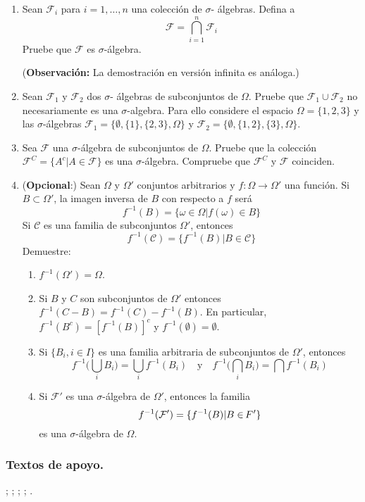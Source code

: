 \begin{enumerate}
	\item Sean $\mathcal{F}_i$ para $i=1,\dots,n$ una colección de $\sigma$- álgebras. Defina a 
	\[
	\mathcal{F} = \bigcap_{i=1}^{n} \mathcal{F}_i
	\]
	Pruebe que $\mathcal{F}$ es $\sigma$-álgebra.
	
	(\textbf{Observación:} La demostración en versión infinita es análoga.)
	
	\item Sean $\mathcal{F}_1$ y $\mathcal{F}_2$ dos $\sigma$- álgebras de subconjuntos de $\Omega$. Pruebe que $\mathcal{F}_1 \cup \mathcal{F}_2$ no necesariamente es una $\sigma$-algebra. Para ello considere el espacio $\Omega = \{1,2,3\}$ y las $\sigma$-álgebras $\mathcal{F}_1 = \{ \emptyset, \{1\}, \{2,3\}, \Omega\}$ y $\mathcal{F}_2 = \{ \emptyset, \{1,2\}, \{3\}, \Omega\}$.
	
	
	\item Sea $\mathcal{F}$ una $\sigma$-álgebra de subconjuntos de $\Omega$. Pruebe que la colección $\mathcal{F}^C = \{ A^c | A \in \mathcal{F}\}$ es una $\sigma$-álgebra. Compruebe que $\mathcal{F}^C$ y $\mathcal{F}$ coinciden.
	
	
	
	\item (\textbf{Opcional}:) Sean $\Omega$ y $\Omega'$ conjuntos arbitrarios y $f:\Omega \rightarrow \Omega'$ una función. Si $B \subset \Omega'$, la imagen inversa de $B$ con respecto a $f$ será 
\[
f^{-1}(B) = \{ \omega \in \Omega | f(\omega ) \in B\}
\]
Si $\mathcal{C}$ es una familia de subconjuntos $\Omega'$, entonces
\[
f^{-1} (\mathcal{C}) = \{ f^{-1} (B) | B \in \mathcal{C}\}
\]
Demuestre:

\begin{enumerate}
	\item $f^{-1}(\Omega') = \Omega$.
	\item Si $B$ y $C$ son subconjuntos de $\Omega'$ entonces $f^{-1}(C-B)=f^{-1}(C)-f^{-1}(B)$. En particular, $f^{-1}(B^{c}) = [f^{-1}(B)]^{c}$ y $f^{-1}(\emptyset)= \emptyset$.
	\item Si $\{ B_i, i \in I\}$ es una familia arbitraria de subconjuntos de $\Omega'$, entonces
	\[
	f^{-1} \Big( \bigcup_{i} B_i \Big) = \bigcup_{i} f^{-1}(B_i) \quad \text{y} \quad f^{-1} \Big( \bigcap_{i} B_i \Big) = \bigcap f^{-1} (B_i)
	\]
	\item Si $\mathcal{F}'$ es una $\sigma$-álgebra de $\Omega'$, entonces la familia
	\[
	f^{-1} (\mathcal{F} ') = \{ f^{-1} (B) | B \in \hspace{1mm} \mathclap{F}\hspace{1.5mm} '\}
	\]
	es una $\sigma$-álgebra de $\Omega$.
\end{enumerate}	

	
\end{enumerate}

\subsubsection*{Textos de apoyo.} 
; ; ; ; .
